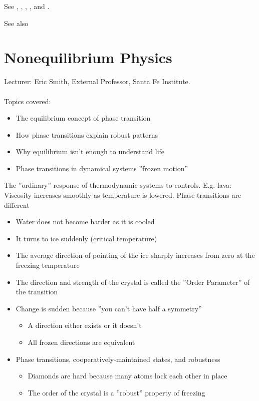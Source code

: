 \documentclass[]{article}
\begin{document}
\begin{appendices}
See \cite{eigen1978hypercycle}, \cite{eigen1988molecular}, \cite{eigen2002error}, \cite{crotty2001rna}, and \cite{stadtler2002fitness_landscapes}.

See also \cite{wessner2010origins}


	\section{Nonequilibrium Physics}

Lecturer: Eric Smith, External Professor, Santa Fe Institute.\\
\\
Topics covered:
\begin{itemize}
	\item The equilibrium concept of phase transition
	
	\item How phase transitions explain robust patterns
	
	\item Why equilibrium isn’t enough to understand life
	\item Phase transitions in dynamical systems ''frozen motion''
\end{itemize}

The ''ordinary'' response of thermodynamic systems to controls. E.g. lava: Viscosity increases smoothly as temperature is lowered. Phase transitions are different
\begin{itemize}
	\item Water does not become harder as it is cooled
	\item It turns to ice suddenly (critical temperature)
	\item The average direction of pointing of the ice sharply increases from zero at the freezing temperature
	\item The direction and strength of the crystal is called the ''Order 	Parameter'' of the transition
	\item Change is sudden because ''you can’t have half a symmetry''
	\begin{itemize}
		\item A direction either exists or it doesn’t
		\item All frozen directions are equivalent
	\end{itemize}
	\item Phase transitions, cooperatively-maintained states, and robustness
	\begin{itemize}
		\item Diamonds are hard because many atoms lock each other in place
		\item The order of the crystal is a ''robust'' property of freezing
	\end{itemize}
\end{itemize}


\end{appendices}
\end{document}

